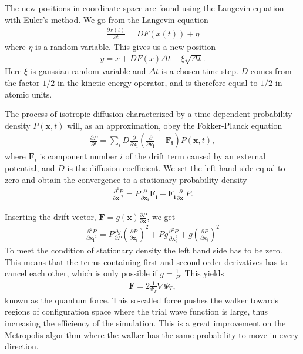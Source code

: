 \documentclass[11pt]{article}
\begin{document}
		The new positions in coordinate space are found using the Langevin
		equation with Euler's method. We go from the Langevin equation
		\begin{align}
			\frac{\partial x(t)}{\partial t}=DF(x(t))+\eta
		\end{align}
		where $\eta$ is a random variable. This gives us a new position
		\begin{align}
			y=x+DF(x)\Delta t+\xi\sqrt{\Delta t}.
		\end{align}
		Here $\xi$ is gaussian random variable and $\Delta t$ is a chosen
		time step. $D$ comes from the factor $1/2$ in the kinetic energy
		operator, and is therefore equal to $1/2$ in atomic units.

		The process of isotropic diffusion characterized by a time-dependent
		probability density $P\left(\mathbf{x},t\right)$ will, as an approximation,
		obey the Fokker-Planck equation
		\begin{align}
			\frac{\partial P}{\partial t}=\sum_{i}D\frac{\partial}{\partial\mathbf{x_{i}}}\left(\frac{\partial}{\partial\mathbf{x_{i}}}-\mathbf{F_{i}}\right)P(\mathbf{x},t),
		\end{align}
		where $\mathbf{F}_{i}$ is component number $i$ of the drift term
		caused by an external potential, and $D$ is the diffusion coefficient.
		We set the left hand side equal to zero and obtain the convergence
		to a stationary probability density
		\begin{align}
			\frac{\partial^{2}P}{\partial{\mathbf{x_{i}}^{2}}}=P\frac{\partial}{\partial{\mathbf{x_{i}}}}\mathbf{F_{i}}+\mathbf{F_{i}}\frac{\partial}{\partial{\mathbf{x_{i}}}}P.
		\end{align}


		Inserting the drift vector, $\mathbf{F}=g(\mathbf{x})\frac{\partial P}{\partial\mathbf{x}}$,
		we get
		\begin{align}
			\frac{\partial^{2}P}{\partial{\mathbf{x_{i}}^{2}}}=P\frac{\partial g}{\partial P}\left(\frac{\partial P}{\partial{\mathbf{x}_{i}}}\right)^{2}+Pg\frac{\partial^{2}P}{\partial{\mathbf{x}_{i}^{2}}}+g\left(\frac{\partial P}{\partial{\mathbf{x}_{i}}}\right)^{2}
		\end{align}
		To meet the condition of stationary density the left hand side has
		to be zero. This means that the terms containing first and second
		order derivatives has to cancel each other, which is only possible
		if $g=\frac{1}{P}$. This yields
		\begin{align}
			\mathbf{F}=2\frac{1}{\Psi_{T}}\nabla\Psi_{T},
		\end{align}
		known as the quantum force. This so-called force pushes the walker
		towards regions of configuration space where the trial wave function
		is large, thus increasing the efficiency of the simulation. This is
		a great improvement on the Metropolis algorithm where the walker has
		the same probability to move in every direction.
\end{document}
